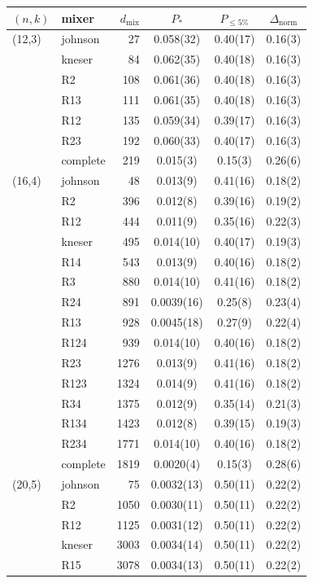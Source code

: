 \begin{tabular}{llrccc}
$(n,k)$ & mixer & $d_{\mathrm{mix}}$ & $P_*$ & $P_{\le5\%}$ & $\Delta_{\mathrm{norm}}$ \\
\hline
(12,3) & johnson & 27 & 0.058(32) & 0.40(17) & 0.16(3) \\
 & kneser & 84 & 0.062(35) & 0.40(18) & 0.16(3) \\
 & R2 & 108 & 0.061(36) & 0.40(18) & 0.16(3) \\
 & R13 & 111 & 0.061(35) & 0.40(18) & 0.16(3) \\
 & R12 & 135 & 0.059(34) & 0.39(17) & 0.16(3) \\
 & R23 & 192 & 0.060(33) & 0.40(17) & 0.16(3) \\
 & complete & 219 & 0.015(3) & 0.15(3) & 0.26(6) \\
(16,4) & johnson & 48 & 0.013(9) & 0.41(16) & 0.18(2) \\
 & R2 & 396 & 0.012(8) & 0.39(16) & 0.19(2) \\
 & R12 & 444 & 0.011(9) & 0.35(16) & 0.22(3) \\
 & kneser & 495 & 0.014(10) & 0.40(17) & 0.19(3) \\
 & R14 & 543 & 0.013(9) & 0.40(16) & 0.18(2) \\
 & R3 & 880 & 0.014(10) & 0.41(16) & 0.18(2) \\
 & R24 & 891 & 0.0039(16) & 0.25(8) & 0.23(4) \\
 & R13 & 928 & 0.0045(18) & 0.27(9) & 0.22(4) \\
 & R124 & 939 & 0.014(10) & 0.40(16) & 0.18(2) \\
 & R23 & 1276 & 0.013(9) & 0.41(16) & 0.18(2) \\
 & R123 & 1324 & 0.014(9) & 0.41(16) & 0.18(2) \\
 & R34 & 1375 & 0.012(9) & 0.35(14) & 0.21(3) \\
 & R134 & 1423 & 0.012(8) & 0.39(15) & 0.19(3) \\
 & R234 & 1771 & 0.014(10) & 0.40(16) & 0.18(2) \\
 & complete & 1819 & 0.0020(4) & 0.15(3) & 0.28(6) \\
(20,5) & johnson & 75 & 0.0032(13) & 0.50(11) & 0.22(2) \\
 & R2 & 1050 & 0.0030(11) & 0.50(11) & 0.22(2) \\
 & R12 & 1125 & 0.0031(12) & 0.50(11) & 0.22(2) \\
 & kneser & 3003 & 0.0034(14) & 0.50(11) & 0.22(2) \\
 & R15 & 3078 & 0.0034(13) & 0.50(11) & 0.22(2) \\

\end{tabular}
